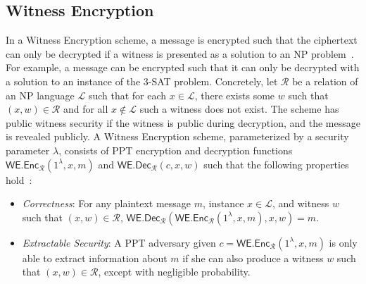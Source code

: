 \subsection{Witness Encryption}
    In a Witness Encryption scheme, a message is encrypted such that the ciphertext can only be decrypted if a witness is presented as a solution to an NP problem~\cite{witness_encryption}.
    For example, a message can be encrypted such that it can only be decrypted with a solution to an instance of the 3-SAT problem.
    Concretely, let $\mathcal{R}$ be a relation of an NP language $\mathcal{L}$ such that for each $x \in \mathcal{L}$, there exists some $w$ such that $(x, w) \in \mathcal{R}$ and for all $x \notin \mathcal{L}$ such a witness does not exist.
    The scheme has public witness security if the witness is public during decryption, and the message is revealed publicly.
    A Witness Encryption scheme, parameterized by a security parameter $\lambda$, consists of PPT encryption and decryption functions $\textsf{WE.Enc}_\mathcal{R}(1^{\lambda}, x, m)$ and $\textsf{WE.Dec}_\mathcal{R}(c, x, w)$ such that the following properties hold~\cite{timelock_from_crc}:
    \begin{itemize}
        \item \emph{Correctness}: For any plaintext message $m$, instance $x \in \mathcal{L}$, and witness $w$ such that $(x, w) \in \mathcal{R}$, $\textsf{WE.Dec}_\mathcal{R}(\textsf{WE.Enc}_\mathcal{R}(1^{\lambda}, x, m), x, w) = m$.
        \item \emph{Extractable Security}: A PPT adversary given $c = \textsf{WE.Enc}_\mathcal{R}(1^{\lambda}, x, m)$ is only able to extract information about $m$ if she can also produce a witness $w$ such that $(x, w) \in \mathcal{R}$, except with negligible probability.
    \end{itemize}
